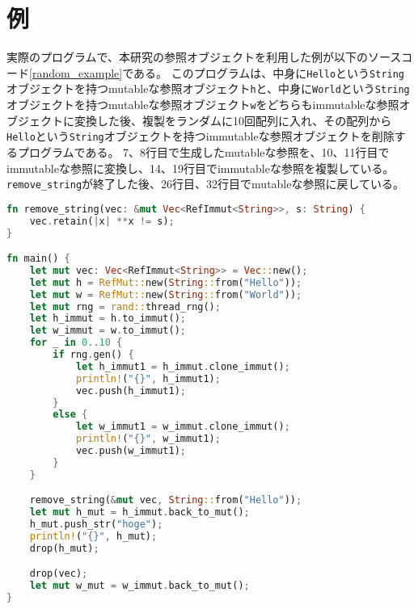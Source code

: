 \documentclass{sumiilab-paper}
\theoremstyle{mystyle}
\numberwithin{definition}{chapter} %
\begin{document}
\section{例}
実際のプログラムで、本研究の参照オブジェクトを利用した例が以下のソースコード\ref{random_example}である。
このプログラムは、中身に\texttt{Hello}という\texttt{String}オブジェクトを持つmutableな参照オブジェクト\texttt{h}と、中身に\texttt{World}という\texttt{String}オブジェクトを持つmutableな参照オブジェクト\texttt{w}をどちらもimmutableな参照オブジェクトに変換した後、複製をランダムに10回配列に入れ、その配列から\texttt{Hello}という\texttt{String}オブジェクトを持つimmutableな参照オブジェクトを削除するプログラムである。
7、8行目で生成したmutableな参照を、10、11行目でimmutableな参照に変換し、14、19行目でimmutableな参照を複製している。\texttt{remove\_string}が終了した後、26行目、32行目でmutableな参照に戻している。
\begin{lstlisting}[language=Rust, caption=新たな参照オブジェクトを用いた柔軟なメモリ管理の例, label=random_example, captionpos=b]
fn remove_string(vec: &mut Vec<RefImmut<String>>, s: String) {
    vec.retain(|x| **x != s);
}

fn main() {
    let mut vec: Vec<RefImmut<String>> = Vec::new();
    let mut h = RefMut::new(String::from("Hello"));
    let mut w = RefMut::new(String::from("World"));
    let mut rng = rand::thread_rng();
    let h_immut = h.to_immut();
    let w_immut = w.to_immut();
    for _ in 0..10 {
        if rng.gen() {
            let h_immut1 = h_immut.clone_immut();
            println!("{}", h_immut1);
            vec.push(h_immut1);
        }
        else {
            let w_immut1 = w_immut.clone_immut();
            println!("{}", w_immut1);
            vec.push(w_immut1);
        }
    }

    remove_string(&mut vec, String::from("Hello"));
    let mut h_mut = h_immut.back_to_mut();
    h_mut.push_str("hoge");
    println!("{}", h_mut);
    drop(h_mut);

    drop(vec);
    let mut w_mut = w_immut.back_to_mut();
}
\end{lstlisting}
\end{document}
